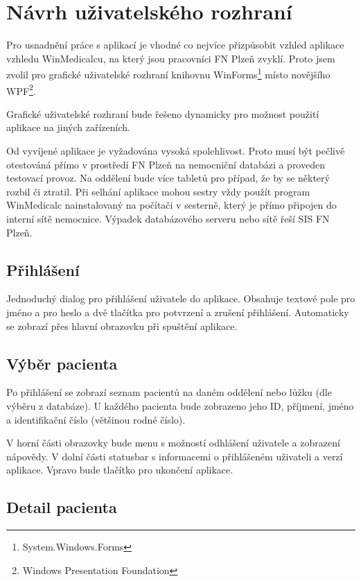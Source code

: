 \chapter{Návrh uživatelského rozhraní}

Pro usnadnění práce s aplikací je vhodné co nejvíce přizpůsobit vzhled aplikace vzhledu WinMedicalcu, na který jsou pracovníci FN Plzeň zvyklí. Proto jsem zvolil pro grafické uživatelské rozhraní knihovnu WinForms\footnote{System.Windows.Forms} místo novějšího WPF\footnote{Windows Presentation Foundation}.

Grafické uživatelské rozhraní bude řešeno dynamicky pro možnost použití aplikace na jiných zařízeních.

Od vyvíjené aplikace je vyžadována vysoká spolehlivost. Proto musí být pečlivě otestováná přímo v prostředí FN Plzeň na nemocniční databázi a proveden testovací provoz. Na oddělení bude více tabletů pro případ, že by se některý rozbil či ztratil. Při selhání aplikace mohou sestry vždy použít program WinMedicalc nainstalovaný na počítači v sesterně, který je přímo připojen do interní sítě nemocnice. Výpadek databázového serveru nebo sítě řeší SIS FN Plzeň.

\section{Přihlášení}

Jednoduchý dialog pro přihlášení uživatele do aplikace. Obsahuje textové pole pro jméno a pro heslo a dvě tlačítka pro potvrzení a zrušení přihlášení. Automaticky se zobrazí přes hlavní obrazovku při spuštění aplikace.

\section{Výběr pacienta}

Po přihlášení se zobrazí seznam pacientů na daném oddělení nebo lůžku (dle výběru z databáze). U každého pacienta bude zobrazeno jeho ID, příjmení, jméno a identifikační číslo (většinou rodné číslo).

V horní části obrazovky bude menu s možností odhlášení uživatele a zobrazení nápovědy. V dolní části statusbar s informacemi o přihlášeném uživateli a verzí aplikace. Vpravo bude tlačítko pro ukončení aplikace.

\section{Detail pacienta}

